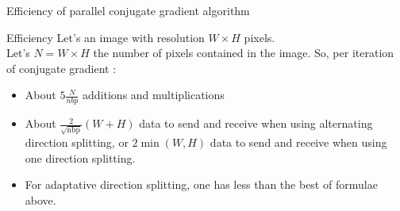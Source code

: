 \documentclass[compress,10pt,aspectratio=169]{beamer}
\begin{document}
\begin{frame}[fragile]{Efficiency of parallel conjugate gradient algorithm}
  \scriptsize
  \begin{block}{Efficiency}
    Let's an image with resolution $W\times H$ pixels.\\
    Let's $N = W \times H$ the number of pixels contained in the image. So, per iteration of conjugate gradient :
    \begin{itemize}
    \item About $5\frac{N}{nbp}$ additions and multiplications
    \item About $\displaystyle \frac{2}{\sqrt{\mbox{nbp}}}\left(W + H\right)$ data to send and receive when using alternating
          direction splitting, or $2\min\left(W,H\right)$ data to send and receive when using one direction splitting.
    \item For adaptative direction splitting, one has less than the best of formulae above.
    \end{itemize}
  \end{block}
\end{frame}
\end{document}
